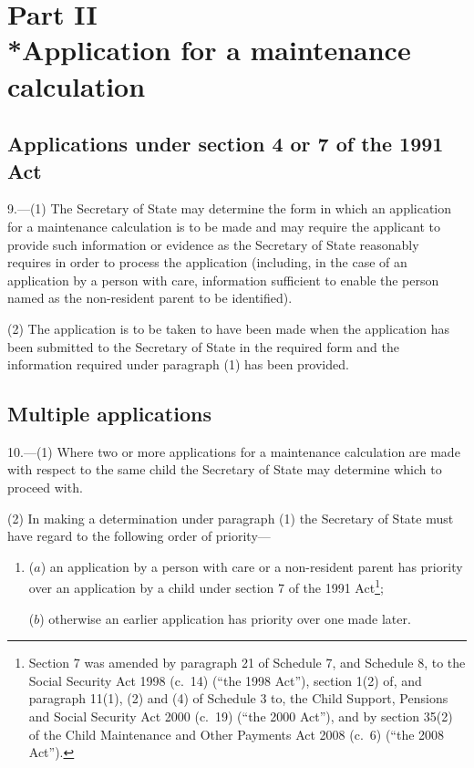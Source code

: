 \documentclass[12pt,a4paper]{article}
\begin{document}
\section[Part II --- Application for a maintenance calculation]{Part II\\*Application for a maintenance calculation}

\renewcommand\parthead{--- Part II}

\subsection[9. Applications under section 4 or 7 of the 1991 Act]{Applications under section 4 or 7 of the 1991 Act}

9.---(1)  The Secretary of State may determine the form in which an application for a maintenance calculation is to be made and may require the applicant to provide such information or evidence as the Secretary of State reasonably requires in order to process the application (including, in the case of an application by a person with care, information sufficient to enable the person named as the non-resident parent to be identified).

(2) The application is to be taken to have been made when the application has been submitted to the Secretary of State in the required form and the information required under paragraph (1) has been provided.

\subsection[10. Multiple applications]{Multiple applications}

10.---(1)  Where two or more applications for a maintenance calculation are made with respect to the same child the Secretary of State may determine which to proceed with.

(2) In making a determination under paragraph (1) the Secretary of State must have regard to the following order of priority—
\begin{enumerate}\item[]
($a$) an application by a person with care or a non-resident parent has priority over an application by a child under section 7 of the 1991 Act\footnote{Section 7 was amended by paragraph 21 of Schedule 7, and Schedule 8, to the Social Security Act 1998 (c.~14) (“the 1998 Act”), section 1(2) of, and paragraph 11(1), (2) and (4) of Schedule 3 to, the Child Support, Pensions and Social Security Act 2000 (c.~19) (“the 2000 Act”), and by section 35(2) of the Child Maintenance and Other Payments Act 2008 (c.~6) (“the 2008 Act”).};

($b$) otherwise an earlier application has priority over one made later.
\end{enumerate}
\end{document}
